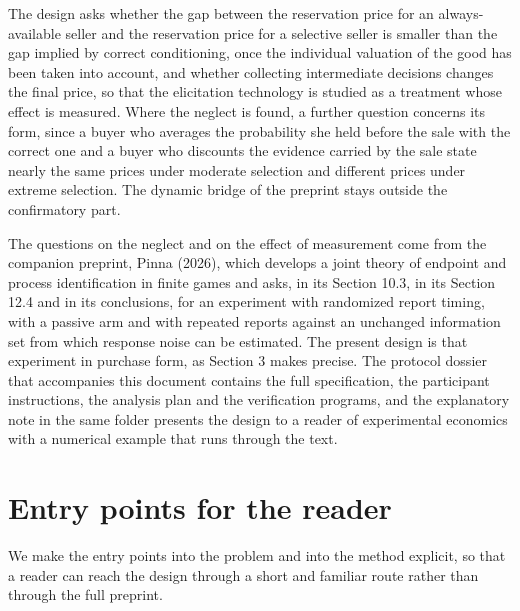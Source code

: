 \documentclass[11pt,a4paper]{article}
\begin{document}
The design asks whether the gap between the reservation price for an always-available seller and the reservation price for a selective seller is smaller than the gap implied by correct conditioning, once the individual valuation of the good has been taken into account, and whether collecting intermediate decisions changes the final price, so that the elicitation technology is studied as a treatment whose effect is measured. Where the neglect is found, a further question concerns its form, since a buyer who averages the probability she held before the sale with the correct one and a buyer who discounts the evidence carried by the sale state nearly the same prices under moderate selection and different prices under extreme selection. The dynamic bridge of the preprint stays outside the confirmatory part.

The questions on the neglect and on the effect of measurement come from the companion preprint, Pinna (2026), which develops a joint theory of endpoint and process identification in finite games and asks, in its Section 10.3, in its Section 12.4 and in its conclusions, for an experiment with randomized report timing, with a passive arm and with repeated reports against an unchanged information set from which response noise can be estimated. The present design is that experiment in purchase form, as Section 3 makes precise. The protocol dossier that accompanies this document contains the full specification, the participant instructions, the analysis plan and the verification programs, and the explanatory note in the same folder presents the design to a reader of experimental economics with a numerical example that runs through the text.

\section{Entry points for the reader}

We make the entry points into the problem and into the method explicit, so that a reader can reach the design through a short and familiar route rather than through the full preprint.
\end{document}
